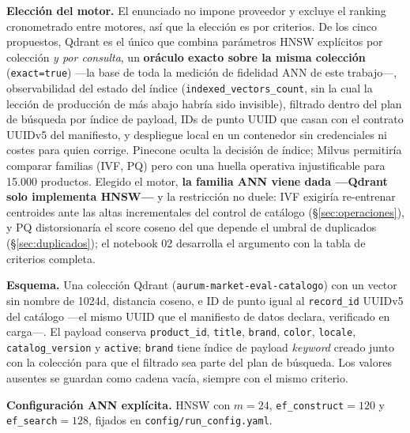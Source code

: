 \documentclass[10pt,twocolumn]{article}
\newcommand{\code}[1]{\texttt{\small #1}}
\begin{document}
\textbf{Elección del motor.} El enunciado no impone proveedor y excluye el
ranking cronometrado entre motores, así que la elección es por criterios.
De los cinco propuestos, Qdrant es el único que combina parámetros HNSW
explícitos por colección \emph{y por consulta}, un \textbf{oráculo exacto
sobre la misma colección} (\code{exact=true}) ---la base de toda la medición
de fidelidad ANN de este trabajo---, observabilidad del estado del índice
(\code{indexed\_vectors\_count}, sin la cual la lección de producción de más
abajo habría sido invisible), filtrado dentro del plan de búsqueda por
índice de payload, IDs de punto UUID que casan con el contrato UUIDv5 del
manifiesto, y despliegue local en un contenedor sin credenciales ni costes
para quien corrige. Pinecone oculta la decisión de índice; Milvus permitiría
comparar familias (IVF, PQ) pero con una huella operativa injustificable
para 15.000 productos. Elegido el motor, \textbf{la familia ANN viene dada
---Qdrant solo implementa HNSW---} y la restricción no duele: IVF exigiría
re-entrenar centroides ante las altas incrementales del control de catálogo
(§\ref{sec:operaciones}), y PQ distorsionaría el score coseno del que
depende el umbral de duplicados (§\ref{sec:duplicados}); el notebook 02
desarrolla el argumento con la tabla de criterios completa.

\textbf{Esquema.} Una colección Qdrant \cite{qdrant}
(\code{aurum-market-eval-catalogo}) con un vector sin nombre de 1024d,
distancia coseno, e ID de punto igual al \code{record\_id} UUIDv5 del
catálogo ---el mismo UUID que el manifiesto de datos declara, verificado en
carga---. El payload conserva \code{product\_id}, \code{title},
\code{brand}, \code{color}, \code{locale}, \code{catalog\_version} y
\code{active}; \code{brand} tiene índice de payload \emph{keyword} creado
junto con la colección para que el filtrado sea parte del plan de búsqueda.
Los valores ausentes se guardan como cadena vacía, siempre con el mismo
criterio.

\textbf{Configuración ANN explícita.} HNSW \cite{malkov2018} con $m{=}24$,
\code{ef\_construct}${=}120$ y \code{ef\_search}${=}128$, fijados en
\code{config/run\_config.yaml}.
\end{document}
